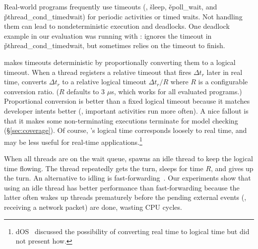 Real-world programs frequently use timeouts (\eg, \v{sleep},
\v{epoll\_wait}, and \v{pthread\_cond\_timedwait}) for periodic activities
or timed waits.  Not handling them can lead to nondeterministic execution and
deadlocks.  One deadlock example in our evaluation was running \pbzip with
\dthreads: \dthreads ignores the timeout in
\v{pthread\_cond\_timedwait}, but \pbzip sometimes relies on the timeout to finish.

\parrot makes timeouts deterministic by proportionally converting them to a
logical timeout.  When a thread registers a relative timeout that fires
$\Delta t_r$ later in real time, \parrot converts $\Delta t_r$ to a relative
logical timeout $\Delta t_r /R$ where $R$ is a configurable conversion
ratio. ($R$ defaults to 3 $\mu$s, which works for all evaluated programs.)
Proportional conversion is better than a fixed logical timeout because it
matches developer intents better (\eg, important activities
run more often).  A nice fallout is that it makes some
non-terminating executions terminate for model checking
(\S\ref{sec:coverage}).  Of course, \parrot's logical time corresponds
loosely to real time, and may be less useful for real-time applications.\footnote{
dOS~\cite{dos:osdi10} discussed the possibility of converting real time to
logical time but did not present how.}


When all threads are on the wait queue, \parrot spawns an idle thread to keep the
logical time flowing. The thread repeatedly gets the turn, sleeps for time
$R$, and gives up the turn.  An alternative to idling is
fast-forwarding~\cite{modist:nsdi09,dos:osdi10}.  Our experiments show
that using an idle thread has better performance than fast-forwarding
because the latter often wakes up threads prematurely before the pending
external events (\eg, receiving a network packet) are done, wasting CPU cycles.

